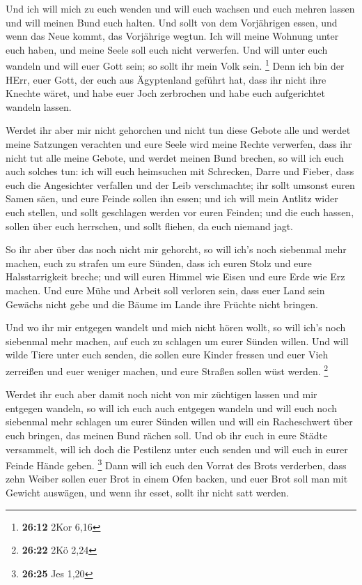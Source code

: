  Und ich will mich zu euch wenden und will euch wachsen und
euch mehren lassen und will meinen Bund euch halten.  Und
sollt von dem Vorjährigen essen, und wenn das Neue kommt, das Vorjährige
wegtun.  Ich will meine Wohnung unter euch haben, und meine
Seele soll euch nicht verwerfen.  Und will unter euch
wandeln und will euer Gott sein; so sollt ihr mein Volk sein.
\footnote{\textbf{26:12} 2Kor 6,16}  Denn ich bin der HErr,
euer Gott, der euch aus Ägyptenland geführt hat, dass ihr nicht ihre
Knechte wäret, und habe euer Joch zerbrochen und habe euch aufgerichtet
wandeln lassen.

 Werdet ihr aber mir nicht gehorchen und nicht tun diese
Gebote alle  und werdet meine Satzungen verachten und eure
Seele wird meine Rechte verwerfen, dass ihr nicht tut alle meine Gebote,
und werdet meinen Bund brechen,  so will ich euch auch
solches tun: ich will euch heimsuchen mit Schrecken, Darre und Fieber,
dass euch die Angesichter verfallen und der Leib verschmachte; ihr sollt
umsonst euren Samen säen, und eure Feinde sollen ihn essen;
 und ich will mein Antlitz wider euch stellen, und sollt
geschlagen werden vor euren Feinden; und die euch hassen, sollen über
euch herrschen, und sollt fliehen, da euch niemand jagt.

 So ihr aber über das noch nicht mir gehorcht, so will
ich's noch siebenmal mehr machen, euch zu strafen um eure Sünden,
 dass ich euren Stolz und eure Halsstarrigkeit breche; und
will euren Himmel wie Eisen und eure Erde wie Erz machen. 
Und eure Mühe und Arbeit soll verloren sein, dass euer Land sein Gewächs
nicht gebe und die Bäume im Lande ihre Früchte nicht bringen.

 Und wo ihr mir entgegen wandelt und mich nicht hören
wollt, so will ich's noch siebenmal mehr machen, auf euch zu schlagen um
eurer Sünden willen.  Und will wilde Tiere unter euch
senden, die sollen eure Kinder fressen und euer Vieh zerreißen und euer
weniger machen, und eure Straßen sollen wüst werden. \footnote{\textbf{26:22}
  2Kö 2,24}

 Werdet ihr euch aber damit noch nicht von mir züchtigen
lassen und mir entgegen wandeln,  so will ich euch auch
entgegen wandeln und will euch noch siebenmal mehr schlagen um eurer
Sünden willen  und will ein Racheschwert über euch bringen,
das meinen Bund rächen soll. Und ob ihr euch in eure Städte versammelt,
will ich doch die Pestilenz unter euch senden und will euch in eurer
Feinde Hände geben. \footnote{\textbf{26:25} Jes 1,20} 
Dann will ich euch den Vorrat des Brots verderben, dass zehn Weiber
sollen euer Brot in einem Ofen backen, und euer Brot soll man mit
Gewicht auswägen, und wenn ihr esset, sollt ihr nicht satt werden.


